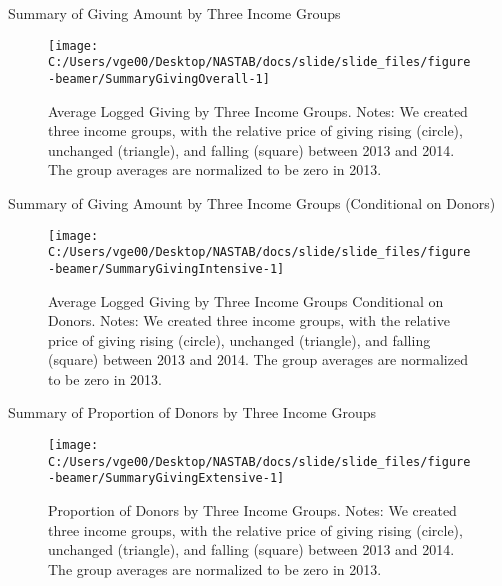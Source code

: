 \documentclass[
  ignorenonframetext,
  aspectratio=169,
]{beamer}
\begin{document}
\begin{frame}{Summary of Giving Amount by Three Income Groups}
\protect\hypertarget{summary-of-giving-amount-by-three-income-groups}{}
\begin{figure}[t]

{\centering \texttt{[image: C:/Users/vge00/Desktop/NASTAB/docs/slide/slide\_files/figure-beamer/SummaryGivingOverall-1]} 

}

\caption{Average Logged Giving by Three Income Groups. Notes: We created three income groups, with the relative price of giving rising (circle), unchanged (triangle), and falling (square) between 2013 and 2014. The group averages are normalized to be zero in 2013.}\label{fig:SummaryGivingOverall}
\end{figure}
\end{frame}

\begin{frame}{Summary of Giving Amount by Three Income Groups (Conditional on Donors)}
\protect\hypertarget{summary-of-giving-amount-by-three-income-groups-conditional-on-donors}{}
\begin{figure}[t]

{\centering \texttt{[image: C:/Users/vge00/Desktop/NASTAB/docs/slide/slide\_files/figure-beamer/SummaryGivingIntensive-1]} 

}

\caption{Average Logged Giving by Three Income Groups Conditional on Donors. Notes: We created three income groups, with the relative price of giving rising (circle), unchanged (triangle), and falling (square) between 2013 and 2014. The group averages are normalized to be zero in 2013.}\label{fig:SummaryGivingIntensive}
\end{figure}
\end{frame}

\begin{frame}{Summary of Proportion of Donors by Three Income Groups}
\protect\hypertarget{summary-of-proportion-of-donors-by-three-income-groups}{}
\begin{figure}[t]

{\centering \texttt{[image: C:/Users/vge00/Desktop/NASTAB/docs/slide/slide\_files/figure-beamer/SummaryGivingExtensive-1]} 

}

\caption{Proportion of Donors by Three Income Groups. Notes: We created three income groups, with the relative price of giving rising (circle), unchanged (triangle), and falling (square) between 2013 and 2014. The group averages are normalized to be zero in 2013.}\label{fig:SummaryGivingExtensive}
\end{figure}
\end{frame}
\end{document}

